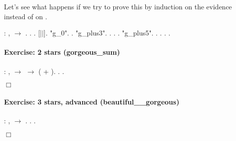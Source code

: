 \documentclass[12pt]{report}
\begin{document}
 Let's see what happens if we try to prove this by induction on the evidence 
   instead of on . \begin{coqdoccode}
\coqdocemptyline
\coqdocnoindent
{}  : \coqdockw{\ensuremath{\forall}} , \coqdoceol
\coqdocindent{1.00em}
  \ensuremath{\rightarrow}  .\coqdoceol
\coqdocnoindent
{}.\coqdoceol
\coqdocindent{1.50em}
  .\coqdoceol
\coqdocindent{1.50em}
   [|\ensuremath{|}].\coqdoceol
\coqdocindent{1.50em}
 "g\_0".\coqdoceol
\coqdocindent{3.50em}
 .\coqdoceol
\coqdocindent{1.50em}
 "g\_plus3".\coqdoceol
\coqdocindent{3.50em}
 .  .\coqdoceol
\coqdocindent{3.50em}
 .\coqdoceol
\coqdocindent{1.50em}
 "g\_plus5".\coqdoceol
\coqdocindent{3.50em}
 .  .  .\coqdoceol
\coqdocnoindent
{}.\coqdoceol
\coqdocemptyline
\coqdocemptyline
\end{coqdoccode}
\paragraph{Exercise: 2 stars (gorgeous\_sum)}

\begin{coqdoccode}
\coqdocnoindent
{}  : \coqdockw{\ensuremath{\forall}}  ,\coqdoceol
\coqdocindent{1.00em}
  \ensuremath{\rightarrow}   \ensuremath{\rightarrow}  ( + ).\coqdoceol
\coqdocnoindent
{}.\coqdoceol
 .\coqdoceol
\end{coqdoccode}
\ensuremath{\Box} 

\paragraph{Exercise: 3 stars, advanced (beautiful\_\_gorgeous)}

\begin{coqdoccode}
\coqdocnoindent
{}  : \coqdockw{\ensuremath{\forall}} ,   \ensuremath{\rightarrow}  .\coqdoceol
\coqdocnoindent
{}.\coqdoceol
 .\coqdoceol
\end{coqdoccode}
\ensuremath{\Box} 
\end{document}
